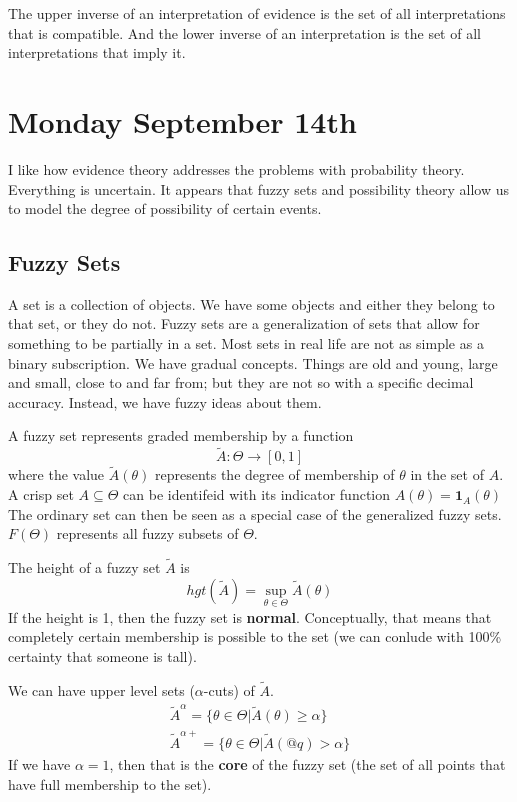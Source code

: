 \documentclass[11pt]{article}
\begin{document}
The upper inverse of an interpretation of evidence is the set of all interpretations that is compatible.
And the lower inverse of an interpretation is the set of all interpretations that imply it.
\section{Monday September 14th}
I like how evidence theory addresses the problems with probability theory.
Everything is uncertain.
It appears that fuzzy sets and possibility theory allow us to model the degree of possibility of certain events.
\subsection{Fuzzy Sets}
A set is a collection of objects.
We have some objects and either they belong to that set, or they do not.
Fuzzy sets are a generalization of sets that allow for something to be partially in a set.
Most sets in real life are not as simple as a binary subscription.
We have gradual concepts.
Things are old and young, large and small, close to and far from; but they are not so with a specific decimal accuracy.
Instead, we have fuzzy ideas about them.

A fuzzy set represents graded membership by a function
\begin{equation}
    \tilde{A} : \Theta \to [0,1]
\end{equation}
where the value $\tilde{A}(\theta)$ represents the degree of membership of $\theta$ in the set of $A$.
A crisp set $A \subseteq \Theta$ can be identifeid with its indicator function $A(\theta) = \textbf{1}_A (\theta)$
The ordinary set can then be seen as a special case of the generalized fuzzy sets.
$F(\Theta)$ represents all fuzzy subsets of $\Theta$.

The height of a fuzzy set $\tilde{A}$ is
\begin{equation}
    hgt(\tilde{A}) = \sup_{\theta \in \Theta} \tilde{A}(\theta)
\end{equation}
If the height is 1, then the fuzzy set is \textbf{normal}.
Conceptually, that means that completely certain membership is possible to the set (we can conlude with 100\% certainty that someone is tall).

We can have upper level sets ($\alpha$-cuts) of $\tilde{A}$.
\begin{gather}
    \tilde{A}^\alpha = \{ \theta \in \Theta | \tilde{A}(\theta) \geq \alpha \} \\
    \tilde{A}^{\alpha +} = \{ \theta \in \Theta | \tilde{A}(@q) > \alpha \}
\end{gather}
If we have $\alpha = 1$, then that is the \textbf{core} of the fuzzy set (the set of all points that have full membership to the set).
\end{document}
